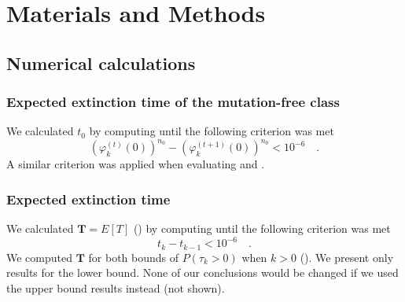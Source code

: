 \documentclass[9pt,lineno]{elife}
\begin{document}
%
%
%
%






\section{Materials and Methods}




\subsection{Numerical calculations}

\subsubsection{Expected extinction time of the mutation-free class}
We calculated $t_0$ by computing  until the following criterion was met 
%
\[ \left(\varphi_{k}^{(t)}(0)\right)^{n_{0}} - \left(\varphi_{k}^{(t+1)}(0)\right)^{n_{0}} < 10^{-6} \quad . \]
%
A similar criterion was applied when evaluating  and . 

\subsubsection{Expected extinction time}
We calculated $\mathbf{T}=E[T]$ () by computing  until the following criterion was met 
%
\[ t_k - t_{k-1} < 10^{-6} \quad . \]
%
We computed $\mathbf{T}$ for both bounds of $P(\tau_{k} > 0)$ when $k>0$ ().  We present only results for the lower bound.  None of our conclusions would be changed if we used the upper bound results instead (not shown).
\end{document}
